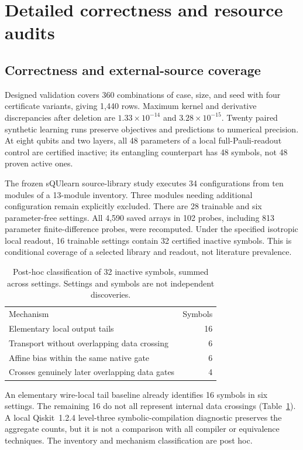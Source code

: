\section{Detailed correctness and resource audits}
\label{app:resource_details}
\subsection{Correctness and external-source coverage}
Designed validation covers 360 combinations of case, size, and seed with four
certificate variants, giving 1,440 rows. Maximum kernel and derivative
discrepancies after deletion are $1.33\times10^{-14}$ and
$3.28\times10^{-15}$. Twenty paired synthetic learning runs preserve
objectives and predictions to numerical precision. At eight qubits
and two layers, all 48 parameters of a local full-Pauli-readout control
are certified inactive; its entangling counterpart has 48 \unknown{}
symbols, not 48 proven active ones.

The frozen sQUlearn source-library study \cite{squlearn} executes 34 configurations from ten modules
of a 13-module inventory. Three modules needing additional
configuration remain explicitly excluded. There are 28 trainable and
six parameter-free settings. All 4,590 saved arrays in 102 probes,
including 813 parameter finite-difference probes, were recomputed.
Under the specified isotropic local readout, 16 trainable settings
contain 32 certified inactive symbols. This is conditional coverage
of a selected library and readout, not literature prevalence.

\begin{table}[t]
\caption{Post-hoc classification of 32 inactive symbols, summed across
settings. Settings and symbols are not independent discoveries.}
\label{tab:mechanisms}
\begin{tabular}{lr}
\toprule
Mechanism & Symbols\\
Elementary local output tails & 16\\
Transport without overlapping data crossing & 6\\
Affine bias within the same native gate & 6\\
Crosses genuinely later overlapping data gates & 4\\
\bottomrule
\end{tabular}
\end{table}

An elementary wire-local tail baseline already identifies 16 symbols
in six settings. The remaining 16 do not all represent internal data
crossings (Table~\ref{tab:mechanisms}). A local Qiskit~1.2.4 level-three
symbolic-compilation diagnostic preserves the aggregate counts, but
it is not a comparison with all compiler or equivalence techniques.
The inventory and mechanism classification are post hoc.

